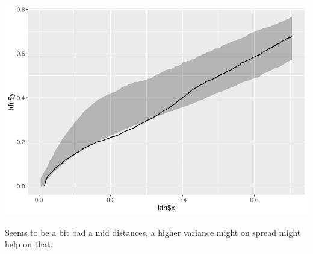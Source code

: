 \documentclass[
]{article}
\begin{document}
\includegraphics{project2_files/figure-latex/unnamed-chunk-13-1.pdf}

Seems to be a bit bad a mid distances, a higher variance might on spread
might help on that.
\end{document}
